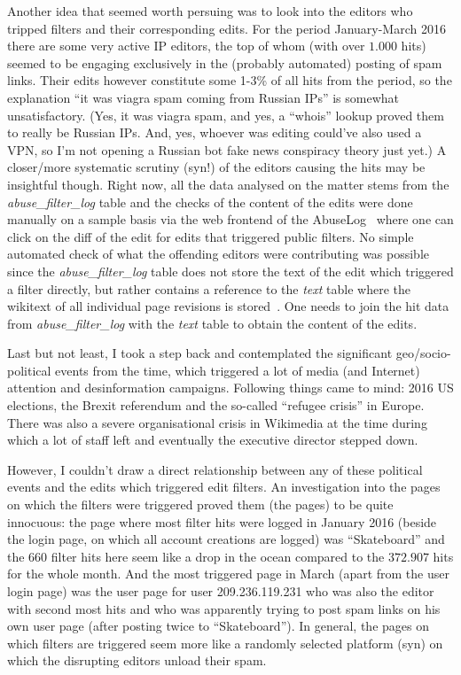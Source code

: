 Another idea that seemed worth persuing was to look into the editors who tripped filters and their corresponding edits.
For the period January-March 2016 there are some very active IP editors, the top of whom (with over $1.000$ hits) seemed to be engaging exclusively in the (probably automated) posting of spam links.
Their edits however constitute some 1-3\% of all hits from the period, so the explanation ``it was viagra spam coming from Russian IPs'' is somewhat unsatisfactory.
(Yes, it was viagra spam, and yes, a ``whois'' lookup proved them to really be Russian IPs.
And, yes, whoever was editing could've also used a VPN, so I'm not opening a Russian bot fake news conspiracy theory just yet.)
A closer/more systematic scrutiny (syn!) of the editors causing the hits may be insightful though.
Right now, all the data analysed on the matter stems from the \emph{abuse\_filter\_log} table and the checks of the content of the edits were done manually on a sample basis via the web frontend of the AbuseLog~\cite{Wikipedia:AbuseLog} where one can click on the diff of the edit for edits that triggered public filters.
No simple automated check of what the offending editors were contributing was possible since the \emph{abuse\_filter\_log} table does not store the text of the edit which triggered a filter directly, but rather contains a reference to the \emph{text} table where the wikitext of all individual page revisions is stored~\cite{Wikipedia:TextTable}.
One needs to join the hit data from \emph{abuse\_filter\_log} with the \emph{text} table to obtain the content of the edits.

Last but not least, I took a step back and contemplated the significant geo/socio-political events from the time, which triggered a lot of media (and Internet) attention and desinformation campaigns.
Following things came to mind: 2016 US elections, the Brexit referendum and the so-called ``refugee crisis'' in Europe.
There was also a severe organisational crisis in Wikimedia at the time during which a lot of staff left and eventually the executive director stepped down.

However, I couldn't draw a direct relationship between any of these political events and the edits which triggered edit filters.
An investigation into the pages on which the filters were triggered proved them (the pages) to be quite innocuous:
the page where most filter hits were logged in January 2016 (beside the login page, on which all account creations are logged) was ``Skateboard'' and the $660$ filter hits here seem like a drop in the ocean compared to the $372.907$ hits for the whole month.
And the most triggered page in March (apart from the user login page) was the user page for user 209.236.119.231 who was also the editor with second most hits and who was apparently trying to post spam links on his own user page (after posting twice to ``Skateboard'').
In general, the pages on which filters are triggered seem more like a randomly selected platform (syn) on which the disrupting editors unload their spam.

